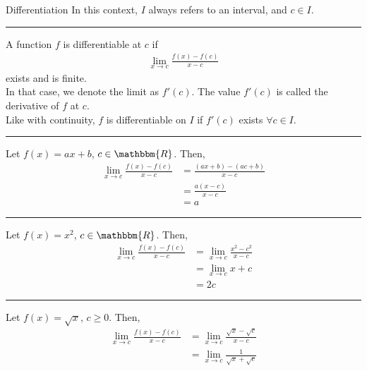 \documentclass[10pt]{extarticle}
\newcommand{\R}{\mathbbm{R}}
\begin{document}
  \begin{problem}{Differentiation}
    In this context, $I$ always refers to an interval, and $c\in I$.\\
    \vspace{4pt}
    \rule{\textwidth}{0.4pt}
    \vspace{4pt}
    A function $f$ is differentiable at $c$ if
    \begin{align*}
      \lim_{x\rightarrow c}\frac{f(x) - f(c)}{x-c}
    \end{align*}
    exists and is finite.\\

    In that case, we denote the limit as $f'(c)$. The value $f'(c)$ is called the derivative of $f$ at $c$.\\

    Like with continuity, $f$ is differentiable on $I$ if $f'(c)$ exists $\forall c\in I$.\\
    \vspace{4pt}
    \rule{\textwidth}{0.4pt}
    \vspace{4pt}
    Let $f(x) = ax+b$, $c\in\R$. Then,
    \begin{align*}
      \lim_{x\rightarrow c} \frac{f(x) - f(c)}{x-c} &= \frac{(ax+b) - (ac+b)}{x-c}\\
                              &= \frac{a(x-c)}{x-c}\\
                              &= a
    \end{align*}
    \vspace{4pt}
    \rule{\textwidth}{0.4pt}
    \vspace{4pt}
    Let $f(x) = x^2$, $c\in\R$. Then,
    \begin{align*}
      \lim_{x\rightarrow c}\frac{f(x) - f(c)}{x-c} &= \lim_{x\rightarrow c}\frac{x^2 - c^2}{x-c}\\
                                                   &= \lim_{x\rightarrow c} x+c\\
                                                   &= 2c
    \end{align*}
    \vspace{4pt}
    \rule{\textwidth}{0.4pt}
    \vspace{4pt}
    Let $f(x) = \sqrt{x}$, $c \geq 0$. Then,
    \begin{align*}
      \lim_{x\rightarrow c} \frac{f(x) - f(c)}{x-c} &= \lim_{x\rightarrow c}\frac{\sqrt{x} - \sqrt{c}}{x-c}\\
                                                    &= \lim_{x\rightarrow c}\frac{1}{\sqrt{x} + \sqrt{c}}\\

\end{align*}
\end{problem}
\end{document}
